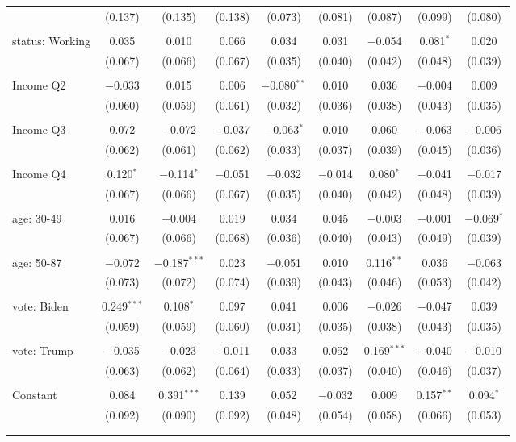 \begin{tabular}{@{\extracolsep{5pt}}lcccccccc}
  & (0.137) & (0.135) & (0.138) & (0.073) & (0.081) & (0.087) & (0.099) & (0.080) \\ 
  & & & & & & & & \\ 
 status: Working & 0.035 & 0.010 & 0.066 & 0.034 & 0.031 & $-$0.054 & 0.081$^{*}$ & 0.020 \\ 
  & (0.067) & (0.066) & (0.067) & (0.035) & (0.040) & (0.042) & (0.048) & (0.039) \\ 
  & & & & & & & & \\ 
 Income Q2 & $-$0.033 & 0.015 & 0.006 & $-$0.080$^{**}$ & 0.010 & 0.036 & $-$0.004 & 0.009 \\ 
  & (0.060) & (0.059) & (0.061) & (0.032) & (0.036) & (0.038) & (0.043) & (0.035) \\ 
  & & & & & & & & \\ 
 Income Q3 & 0.072 & $-$0.072 & $-$0.037 & $-$0.063$^{*}$ & 0.010 & 0.060 & $-$0.063 & $-$0.006 \\ 
  & (0.062) & (0.061) & (0.062) & (0.033) & (0.037) & (0.039) & (0.045) & (0.036) \\ 
  & & & & & & & & \\ 
 Income Q4 & 0.120$^{*}$ & $-$0.114$^{*}$ & $-$0.051 & $-$0.032 & $-$0.014 & 0.080$^{*}$ & $-$0.041 & $-$0.017 \\ 
  & (0.067) & (0.066) & (0.067) & (0.035) & (0.040) & (0.042) & (0.048) & (0.039) \\ 
  & & & & & & & & \\ 
 age: 30-49 & 0.016 & $-$0.004 & 0.019 & 0.034 & 0.045 & $-$0.003 & $-$0.001 & $-$0.069$^{*}$ \\ 
  & (0.067) & (0.066) & (0.068) & (0.036) & (0.040) & (0.043) & (0.049) & (0.039) \\ 
  & & & & & & & & \\ 
 age: 50-87 & $-$0.072 & $-$0.187$^{***}$ & 0.023 & $-$0.051 & 0.010 & 0.116$^{**}$ & 0.036 & $-$0.063 \\ 
  & (0.073) & (0.072) & (0.074) & (0.039) & (0.043) & (0.046) & (0.053) & (0.042) \\ 
  & & & & & & & & \\ 
 vote: Biden & 0.249$^{***}$ & 0.108$^{*}$ & 0.097 & 0.041 & 0.006 & $-$0.026 & $-$0.047 & 0.039 \\ 
  & (0.059) & (0.059) & (0.060) & (0.031) & (0.035) & (0.038) & (0.043) & (0.035) \\ 
  & & & & & & & & \\ 
 vote: Trump & $-$0.035 & $-$0.023 & $-$0.011 & 0.033 & 0.052 & 0.169$^{***}$ & $-$0.040 & $-$0.010 \\ 
  & (0.063) & (0.062) & (0.064) & (0.033) & (0.037) & (0.040) & (0.046) & (0.037) \\ 
  & & & & & & & & \\ 
 Constant & 0.084 & 0.391$^{***}$ & 0.139 & 0.052 & $-$0.032 & 0.009 & 0.157$^{**}$ & 0.094$^{*}$ \\ 
  & (0.092) & (0.090) & (0.092) & (0.048) & (0.054) & (0.058) & (0.066) & (0.053) \\ 
  & & & & & & & & \\ 
\hline \\[-1.8ex] 


\end{tabular}

